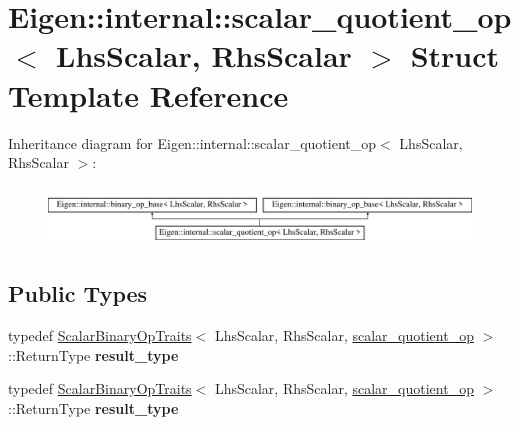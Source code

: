\hypertarget{struct_eigen_1_1internal_1_1scalar__quotient__op}{}\section{Eigen\+:\+:internal\+:\+:scalar\+\_\+quotient\+\_\+op$<$ Lhs\+Scalar, Rhs\+Scalar $>$ Struct Template Reference}
\label{struct_eigen_1_1internal_1_1scalar__quotient__op}
Inheritance diagram for Eigen\+:\+:internal\+:\+:scalar\+\_\+quotient\+\_\+op$<$ Lhs\+Scalar, Rhs\+Scalar $>$\+:\begin{figure}[H]
\begin{center}
\leavevmode
\includegraphics[height=1.555556cm]{struct_eigen_1_1internal_1_1scalar__quotient__op}
\end{center}
\end{figure}
\subsection*{Public Types}
\begin{DoxyCompactItemize}
\item 
\mbox{\label{struct_eigen_1_1internal_1_1scalar__quotient__op_aee52c35f33c78ec479dbe3f353edf7e8}} 
typedef \hyperlink{group___core___module_struct_eigen_1_1_scalar_binary_op_traits}{Scalar\+Binary\+Op\+Traits}$<$ Lhs\+Scalar, Rhs\+Scalar, \hyperlink{struct_eigen_1_1internal_1_1scalar__quotient__op}{scalar\+\_\+quotient\+\_\+op} $>$\+::Return\+Type {\bfseries result\+\_\+type}
\item 
\mbox{\label{struct_eigen_1_1internal_1_1scalar__quotient__op_aee52c35f33c78ec479dbe3f353edf7e8}} 
typedef \hyperlink{group___core___module_struct_eigen_1_1_scalar_binary_op_traits}{Scalar\+Binary\+Op\+Traits}$<$ Lhs\+Scalar, Rhs\+Scalar, \hyperlink{struct_eigen_1_1internal_1_1scalar__quotient__op}{scalar\+\_\+quotient\+\_\+op} $>$\+::Return\+Type {\bfseries result\+\_\+type}
\end{DoxyCompactItemize}
